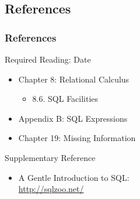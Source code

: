 \documentclass[dvipsnames]{beamer}
\theoremstyle{plain}
\begin{document}
\subsection*{References}

\begin{frame}
  \frametitle{References}

  \begin{block}{Required Reading: Date}
    \begin{itemize}
      \item Chapter 8: Relational Calculus
      \begin{itemize}
        \item 8.6. \alert{SQL Facilities}
      \end{itemize}

      \item Appendix B: \alert{SQL Expressions}
      \item Chapter 19: Missing Information
    \end{itemize}
  \end{block}

  \begin{block}{Supplementary Reference}
    \begin{itemize}
      \item A Gentle Introduction to SQL:\\
        \url{http://sqlzoo.net/}
    \end{itemize}
  \end{block}
\end{frame}
\end{document}
